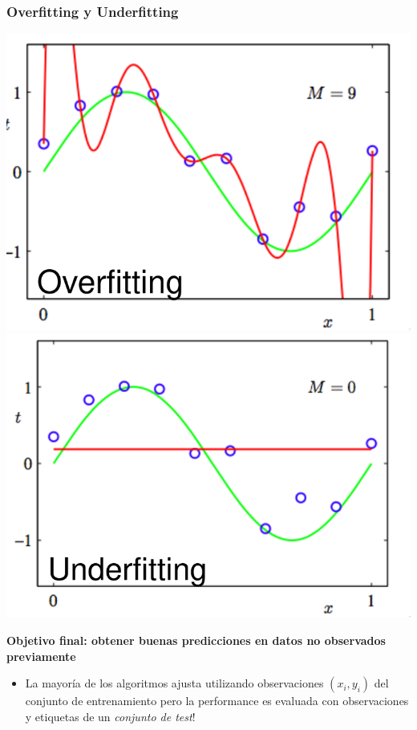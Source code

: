 \documentclass[leqno, 10pt, envcountsect]{beamer}
\numberwithin{equation}{section}
\theoremstyle{definition}
\theoremstyle{example}
\numberwithin{figure}{section}
\numberwithin{table}{section}
\let\olditem\item
\renewcommand{\item}{%
\olditem\vspace{1pt}}
\begin{document}
\begin{frame}
  \frametitle{Overfitting y Underfitting}
  \begin{center}
    \includegraphics[scale=0.12]{overfitting.png}
    \includegraphics[scale=0.12]{underfitting.png}
  \end{center}
    \textbf{Objetivo final: obtener buenas predicciones en datos no observados previamente}
      \begin{itemize}
        \item La mayoría de los algoritmos ajusta utilizando observaciones
          $(x_{i}, y_{i})$ del conjunto de entrenamiento pero la performance es
          evaluada con observaciones y etiquetas de un \textit{conjunto de test}!
      \begin{itemize}

\end{itemize}
\end{itemize}
\end{frame}
\end{document}
